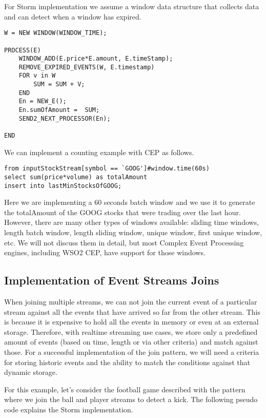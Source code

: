 \documentclass{sig-alternate}
\begin{document}
{For Storm implementation we assume a window data structure that collects data and can detect when a window has expired. 

\begin{lstlisting}[mathescape, showstringspaces=false]
W = NEW WINDOW(WINDOW_TIME); 

PROCESS(E) 
	WINDOW_ADD(E.price*E.amount, E.timeStamp); 
	REMOVE_EXPIRED_EVENTS(W, E.timestamp)
	FOR v in W
		SUM = SUM + V; 
	END
	En = NEW_E(); 
	En.sumOfAmount =  SUM; 
	SEND2_NEXT_PROCESSOR(En); 
	
END
\end{lstlisting}


We can implement a counting example with CEP as follows.

\begin{lstlisting}[mathescape, showstringspaces=false]
from inputStockStream[symbol == `GOOG']#window.time(60s)
select sum(price*volume) as totalAmount
insert into lastMinStocksOfGOOG; 
\end{lstlisting}


Here we are implementing a 60 seconds batch window and we use it to generate the totalAmount of the GOOG stocks that were trading over the last hour. However, there are many other types of windows available:  sliding time windows, length batch window, length sliding window, unique window, first unique window, etc.  We will not discuss them in detail, but most Complex Event Processing engines, including WSO2 CEP, have support for those windows. 

\subsection{Implementation of Event Streams Joins}
When joining multiple streams, we can not join the current event of a particular stream against all the events that have arrived so far from the other stream. This is because it is expensive to hold all the events in memory or even at an external storage. Therefore, with realtime streaming use cases, we store only a predefined amount of events (based on time, length or via other criteria) and match against those. For a successful implementation of the join pattern, we will need a criteria for storing historic events and the ability to match the conditions against that dynamic storage. 

For this example, let's consider the football game described with the pattern where we join the ball and player streams to detect a kick. The following pseudo code explains the Storm implementation. 

}
\end{document}
